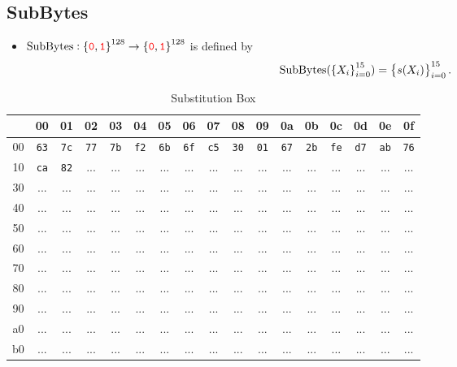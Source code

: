\subsection{SubBytes}
\begin{itemize}
	\item $\text{SubBytes}:\set{\textcolor{red}{\texttt{0}},\textcolor{red}{\texttt{1}}}^{128}\to\set{\textcolor{red}{\texttt{0}},\textcolor{red}{\texttt{1}}}^{128}$ is defined by \[
	\text{SubBytes}(\set{X_i}_{i=0}^{15})=\set{s(X_i)}_{i=0}^{15}.
	\]
\end{itemize}

\newcommand{\headerrow}{%
	& 00 & 01 & 02 & 03 & 04 & 05 & 06 & 07 & 08 & 09 & 0a & 0b & 0c & 0d & 0e & 0f \\
}

\begin{longtable}{|c||*{16}{c|}}
	\caption{Substitution Box}\\
	\hline
	\headerrow \endhead %
	\hline\hline
	00 & \texttt{63} & \texttt{7c} & \texttt{77} & \texttt{7b} & \texttt{f2} & \texttt{6b} & \texttt{6f} & \texttt{c5} & \texttt{30} & \texttt{01} & \texttt{67} & \texttt{2b} & \texttt{fe} & \texttt{d7} & \texttt{ab} & \texttt{76} \\
	\hline
	10 & \texttt{ca} & \texttt{82} & ... & ... & ... & ... & ... & ... & ... & ... & ... & ... & ... & ... & ... & ... \\
	\hline
	30 & ... & ... & ... & ... & ... & ... & ... & ... & ... & ... & ... & ... & ... & ... & ... & ... \\
	\hline
	40 & ... & ... & ... & ... & ... & ... & ... & ... & ... & ... & ... & ... & ... & ... & ... & ... \\
	\hline
	50 & ... & ... & ... & ... & ... & ... & ... & ... & ... & ... & ... & ... & ... & ... & ... & ... \\
	\hline
	60 & ... & ... & ... & ... & ... & ... & ... & ... & ... & ... & ... & ... & ... & ... & ... & ... \\
	\hline
	70 & ... & ... & ... & ... & ... & ... & ... & ... & ... & ... & ... & ... & ... & ... & ... & ... \\
	\hline
	80 & ... & ... & ... & ... & ... & ... & ... & ... & ... & ... & ... & ... & ... & ... & ... & ... \\
	\hline
	90 & ... & ... & ... & ... & ... & ... & ... & ... & ... & ... & ... & ... & ... & ... & ... & ... \\
	\hline
	a0 & ... & ... & ... & ... & ... & ... & ... & ... & ... & ... & ... & ... & ... & ... & ... & ... \\
	\hline
	b0 & ... & ... & ... & ... & ... & ... & ... & ... & ... & ... & ... & ... & ... & ... & ... & ... \\

\end{longtable}
